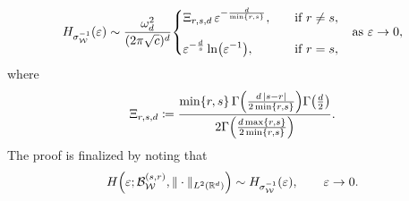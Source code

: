\documentclass[a4paper,12pt]{article}
\let\originalleft\left
\let\originalright\right
\renewcommand{\left}{\mathopen{}\mathclose\bgroup\originalleft}
\renewcommand{\right}{\aftergroup\egroup\originalright}
\newcommand{\symbolnotsobw}{\symbolnot_{\mathcal{W}}}
\newcommand{\symbolnot}{\sigma}
\begin{document}
\begin{equation*}
    H_{\symbolnotsobw^{-1}}(\varepsilon)
    \sim \frac{\omega_d^2}{(2\pi\sqrt{c})^{d}}
    \begin{dcases}
        \Xi_{r,s,d}\, \varepsilon^{-\frac{d}{\min\{r,s\}}}, 
        \quad &\text{if } r\neq s,\\[.25cm]           
        \varepsilon^{-\frac{d}{s}}\ln\left(\varepsilon^{-1}\right), \quad &\text{if } r=s,
    \end{dcases}
    \quad \text{as } \varepsilon\to 0,
\end{equation*}
where 
\begin{equation*}
     \Xi_{r,s,d}
     \coloneqq \frac{\min\{r,s\} \, \Gamma\left(\frac{d \, |s-r| }{2 \min\{r,s\}}\right) \Gamma \left( \frac{d}{2} \right)}{2\Gamma \left(\frac{d\max\{r,s\} }{2\min\{r,s\} }\right)}.
\end{equation*}
The proof is finalized by noting that
\[
H \left(\varepsilon;\mathcal{B}_{\mathcal{W}}^{(s,r)},\|\cdot\|_{L^2(\mathbb R^d)}\right)
\sim
H_{\symbolnotsobw^{-1}}(\varepsilon),
\qquad \varepsilon \to 0.
\]
\fi
\color{black}
\end{document}
